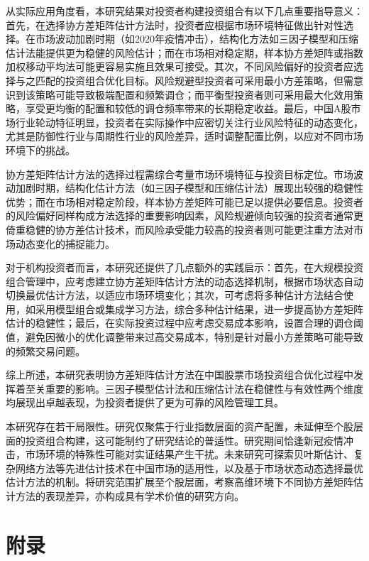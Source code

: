 \documentclass[12pt, a4paper]{article}
\begin{document}
从实际应用角度看，本研究结果对投资者构建投资组合有以下几点重要指导意义：首先，在选择协方差矩阵估计方法时，投资者应根据市场环境特征做出针对性选择。在市场波动加剧时期（如2020年疫情冲击），结构化方法如三因子模型和压缩估计法能提供更为稳健的风险估计；而在市场相对稳定期，样本协方差矩阵或指数加权移动平均法可能更容易实施且效果可接受。其次，不同风险偏好的投资者应选择与之匹配的投资组合优化目标。风险规避型投资者可采用最小方差策略，但需意识到该策略可能导致极端配置和频繁调仓；而平衡型投资者则可采用最大化效用策略，享受更均衡的配置和较低的调仓频率带来的长期稳定收益。最后，中国A股市场行业轮动特征明显，投资者在实际操作中应密切关注行业风险特征的动态变化，尤其是防御性行业与周期性行业的风险差异，适时调整配置比例，以应对不同市场环境下的挑战。

协方差矩阵估计方法的选择过程需综合考量市场环境特征与投资目标定位。市场波动加剧时期，结构化估计方法（如三因子模型和压缩估计法）展现出较强的稳健性优势；而在市场相对稳定阶段，样本协方差矩阵可能已足以提供必要信息。投资者的风险偏好同样构成方法选择的重要影响因素，风险规避倾向较强的投资者通常更倚重稳健的协方差估计技术，而风险承受能力较高的投资者则可能更注重方法对市场动态变化的捕捉能力。

对于机构投资者而言，本研究还提供了几点额外的实践启示：首先，在大规模投资组合管理中，应考虑建立协方差矩阵估计方法的动态选择机制，根据市场状态自动切换最优估计方法，以适应市场环境变化；其次，可考虑将多种估计方法结合使用，如采用模型组合或集成学习方法，综合多种估计结果，进一步提高协方差矩阵估计的稳健性；最后，在实际投资过程中应考虑交易成本影响，设置合理的调仓阈值，避免因微小的优化调整带来过高交易成本，特别是针对最小方差策略可能导致的频繁交易问题。

综上所述，本研究表明协方差矩阵估计方法在中国股票市场投资组合优化过程中发挥着至关重要的影响。三因子模型估计法和压缩估计法在稳健性与有效性两个维度均展现出卓越表现，为投资者提供了更为可靠的风险管理工具。

本研究存在若干局限性。研究仅聚焦于行业指数层面的资产配置，未延伸至个股层面的投资组合构建，这可能制约了研究结论的普适性。研究期间恰逢新冠疫情冲击，市场环境的特殊性可能对实证结果产生干扰。未来研究可探索贝叶斯估计、复杂网络方法等先进估计技术在中国市场的适用性，以及基于市场状态动态选择最优估计方法的机制。将研究范围扩展至个股层面，考察高维环境下不同协方差矩阵估计方法的表现差异，亦构成具有学术价值的研究方向。

\printbibliography[title=参考文献]

\section{附录}
\end{document}
